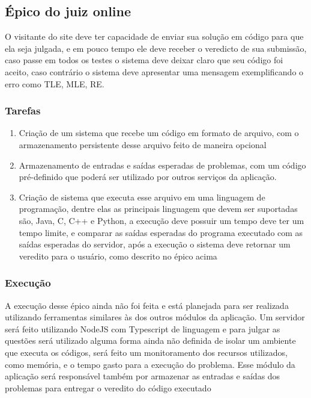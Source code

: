 \subsection{Épico do juiz online}

O visitante do site deve ter capacidade de enviar sua solução em código para que ela seja julgada, e em pouco tempo ele deve receber o veredicto de sua submissão, caso passe em todos os testes o sistema deve deixar claro que seu código foi aceito, caso contrário o sistema deve apresentar uma mensagem exemplificando o erro como TLE, MLE, RE.

\subsubsection{Tarefas}
\begin{enumerate}
    \item Criação de um sistema que recebe um código em formato de arquivo, com o armazenamento persistente desse arquivo feito de maneira opcional
    \item Armazenamento de entradas e saídas esperadas de problemas, com um código pré-definido que poderá ser utilizado por outros serviços da aplicação.
    \item Criação de sistema que executa esse arquivo em uma linguagem de programação, dentre elas as principais linguagem que devem ser suportadas são, Java, C, C++ e Python, a execução deve possuir um tempo deve ter um tempo limite, e comparar as saídas esperadas do programa executado com as saídas esperadas do servidor, após a execução o sistema deve retornar um veredito para o usuário, como descrito no épico acima
\end{enumerate}

\subsubsection{Execução}

A execução desse épico ainda não foi feita e está planejada para ser realizada utilizando ferramentas similares às dos outros módulos da aplicação. Um servidor será feito utilizando NodeJS com Typescript de linguagem e para julgar as questões será utilizado alguma forma ainda não definida de isolar um ambiente que executa os códigos, será feito um monitoramento dos recursos utilizados, como memória, e o tempo gasto para a execução do problema. Esse módulo da aplicação será responsável também por armazenar as entradas e saídas dos problemas para entregar o veredito do código executado

